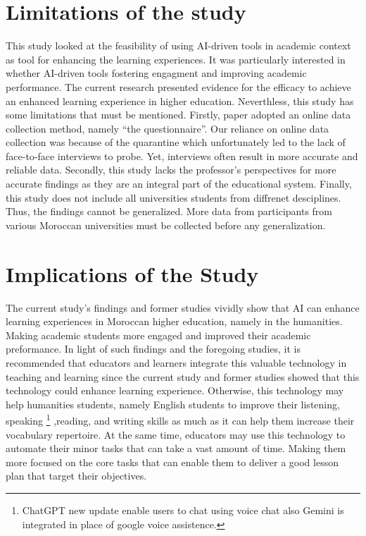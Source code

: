 \section{Limitations of the study}
This study looked at the feasibility of using AI-driven tools in academic context as tool
for enhancing the learning experiences. It was particularly interested in whether AI-driven
tools fostering engagment and improving academic performance. The current research presented
evidence for the efficacy to achieve an enhanced learning experience in higher education.
Neverthless, this study has some limitations that must be mentioned. Firstly, paper adopted
an online data collection method, namely “the questionnaire”. Our reliance
on online data collection was because of the quarantine which unfortunately led to the lack
of face-to-face interviews to probe. Yet, interviews often result in more accurate and
reliable data. Secondly, this study lacks the professor’s perspectives for more accurate
findings as they are an integral part of the educational system. Finally, this study does not
include all universities students from diffrenet desciplines. Thus, the findings cannot be generalized. More data
from participants from various Moroccan universities must be collected before any
generalization.

\section{Implications of the Study}
The current study’s findings and former studies vividly show that AI can enhance learning
experiences in Moroccan higher education, namely in the humanities. Making academic students
more engaged and improved their academic preformance. In light
of such findings and the foregoing studies, it is recommended that educators and learners
integrate this valuable technology in teaching and learning since the current
study and former studies showed that this technology could enhance learning experience.
Otherwise, this technology may help humanities students, namely English students to improve their
listening, speaking \footnote{ChatGPT new update enable users to chat using voice chat also Gemini is integrated in place of google voice assistence.}
,reading, and writing skills as much as it can help them increase their
vocabulary repertoire. At the same time, educators may use this technology to automate their minor tasks that can take
a vast amount of time. Making them more focused on the core tasks that can enable them to deliver a good lesson plan
that target their objectives.
